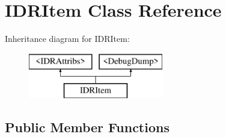 \hypertarget{interface_i_d_r_item}{
\section{IDRItem Class Reference}
\label{interface_i_d_r_item}
}
Inheritance diagram for IDRItem:\begin{figure}[H]
\begin{center}
\leavevmode
\includegraphics[height=2.000000cm]{interface_i_d_r_item}
\end{center}
\end{figure}
\subsection*{Public Member Functions}
